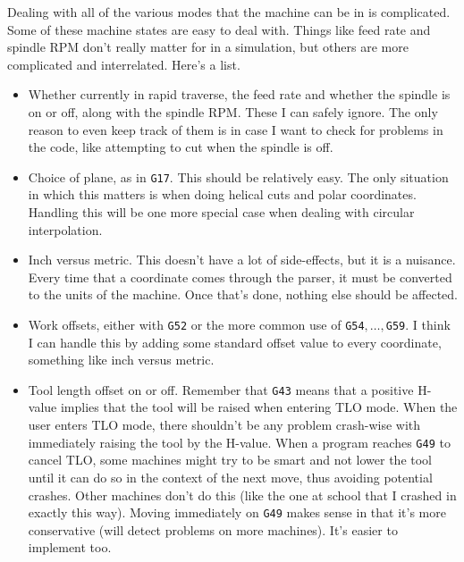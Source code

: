 \documentclass[titlepage,oneside,10pt]{article}
\begin{document}
Dealing with all of the various modes that the machine can be in is
complicated. Some of these machine states are easy to deal
with. Things like feed rate and spindle RPM don't really matter for in
a simulation, but others are more complicated and interrelated. Here's
a list.

\begin{itemize}
\setlength{\itemsep}{-1mm}
\item Whether currently in rapid traverse, the feed rate and whether
  the spindle is on or off, along with the spindle RPM. These I can
  safely ignore. The only reason to even keep track of them is in case
  I want to check for problems in the code, like attempting to cut
  when the spindle is off. 
\item Choice of plane, as in {\tt G17}. This should be relatively
  easy. The only situation in which this matters is when doing helical
  cuts and polar coordinates. Handling this will be one more special
  case when dealing with circular interpolation. 
\item Inch versus metric. This doesn't have a lot of side-effects, but
  it is a nuisance. Every time that a coordinate comes through the
  parser, it must be converted to the units of the machine. Once
  that's done, nothing else should be affected.
\item Work offsets, either with {\tt G52} or the more common use of
  {\tt G54}$,\ldots,${\tt G59}. I think I can handle this by adding
  some standard offset value to every coordinate, something like inch
  versus metric.
\item Tool length offset on or off. Remember that {\tt G43} means that
  a positive H-value implies that the tool will be raised when
  entering TLO mode. When the user enters TLO mode, there shouldn't be
  any problem crash-wise with immediately raising the tool by the
  H-value. When a program reaches {\tt G49} to cancel TLO, some
  machines might try to be smart and not lower the tool until it can
  do so in the context of the next move, thus avoiding potential
  crashes. Other machines don't do this (like the one at school that I
  crashed in exactly this way). Moving immediately on {\tt G49} makes
  sense in that it's more conservative (will detect problems on more
  machines). It's easier to implement too. 


\end{itemize}
\end{document}
